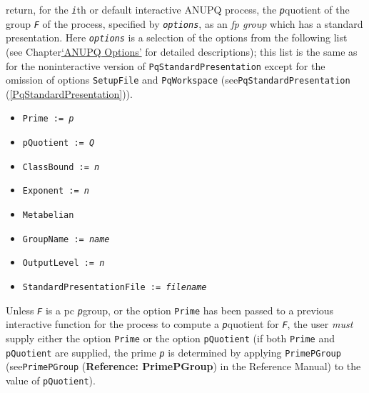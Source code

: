 \documentclass[a4paper,11pt]{report}
\begin{document}
{{{ return, for the \mbox{\texttt{\mdseries\slshape i}}th or default interactive \textsf{ANUPQ} process, the \mbox{\texttt{\mdseries\slshape p}}\texttt{}quotient of the group \mbox{\texttt{\mdseries\slshape F}} of the process, specified by \mbox{\texttt{\mdseries\slshape options}}, as an \emph{fp group} which has a standard presentation. Here \mbox{\texttt{\mdseries\slshape options}} is a selection of the options from the following list (see
Chapter{\nobreakspace}\hyperref[ANUPQ Options]{`ANUPQ Options'} for detailed descriptions); this list is the same as for the
non\texttt{}interactive version of \texttt{PqStandardPresentation} except for the omission of options \texttt{SetupFile} and \texttt{PqWorkspace} (see{\nobreakspace}\texttt{PqStandardPresentation} (\ref{PqStandardPresentation})). 
\begin{itemize}
\item  \texttt{Prime := \mbox{\texttt{\mdseries\slshape p}}} 
\item  \texttt{pQuotient := \mbox{\texttt{\mdseries\slshape Q}}} 
\item  \texttt{ClassBound := \mbox{\texttt{\mdseries\slshape n}}} 
\item  \texttt{Exponent := \mbox{\texttt{\mdseries\slshape n}}} 
\item  \texttt{Metabelian} 
\item  \texttt{GroupName := \mbox{\texttt{\mdseries\slshape name}}} 
\item  \texttt{OutputLevel := \mbox{\texttt{\mdseries\slshape n}}} 
\item  \texttt{StandardPresentationFile := \mbox{\texttt{\mdseries\slshape filename}}} 
\end{itemize}
 Unless \mbox{\texttt{\mdseries\slshape F}} is a pc \mbox{\texttt{\mdseries\slshape p}}\texttt{}group, or the option \texttt{Prime} has been passed to a previous interactive function for the process to compute
a \mbox{\texttt{\mdseries\slshape p}}\texttt{}quotient for \mbox{\texttt{\mdseries\slshape F}}, the user \emph{must} supply either the option \texttt{Prime} or the option \texttt{pQuotient} (if both \texttt{Prime} and \texttt{pQuotient} are supplied, the prime \mbox{\texttt{\mdseries\slshape p}} is determined by applying \texttt{PrimePGroup} (see{\nobreakspace}\texttt{PrimePGroup} (\textbf{Reference: PrimePGroup}) in the Reference Manual) to the value of \texttt{pQuotient}). 

}}}
\end{document}
